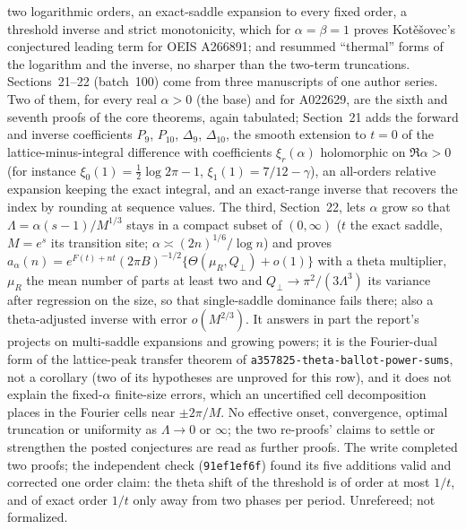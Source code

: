 \documentclass[11pt]{article}
\newcommand{\dir}[1]{\texttt{#1}}
\begin{document}
{two logarithmic orders, an exact-saddle expansion to every fixed order, a
threshold inverse and strict monotonicity, which for $\alpha=\beta=1$ proves
Kot\v{e}\v{s}ovec's conjectured leading term for OEIS A266891; and resummed
``thermal'' forms of the logarithm and the inverse, no sharper than the
two-term truncations.
Sections~21--22 (batch~100) come from three manuscripts of one author series.
Two of them, for every real $\alpha>0$ (the base) and for A022629, are the
sixth and seventh proofs of the core theorems, again tabulated; Section~21
adds the forward and inverse coefficients $P_9$, $P_{10}$, $\Delta_9$,
$\Delta_{10}$, the smooth extension to $t=0$ of the lattice-minus-integral
difference with coefficients $\xi_r(\alpha)$ holomorphic on $\Re\alpha>0$
(for instance $\xi_0(1)=\frac12\log2\pi-1$, $\xi_1(1)=7/12-\gamma$), an
all-orders relative expansion keeping the exact integral, and an exact-range
inverse that recovers the index by rounding at sequence values.  The third,
Section~22, lets $\alpha$ grow so that $\Lambda=\alpha(s-1)/M^{1/3}$ stays in
a compact subset of $(0,\infty)$ ($t$ the exact saddle, $M=e^s$ its
transition site; $\alpha\asymp(2n)^{1/6}/\log n$) and proves
$a_\alpha(n)=e^{F(t)+nt}(2\pi B)^{-1/2}\{\Theta(\mu_R,Q_\perp)+o(1)\}$ with
a theta multiplier, $\mu_R$ the mean number of parts at least two and
$Q_\perp\to\pi^2/(3\Lambda^3)$ its variance after regression on the size, so
that single-saddle dominance fails there; also a theta-adjusted inverse with
error $o(M^{2/3})$.  It answers in part the report's projects on multi-saddle
expansions and growing powers; it is the Fourier-dual form of the lattice-peak
transfer theorem of \dir{a357825-theta-ballot-power-sums}, not a corollary
(two of its hypotheses are unproved for this row), and it does not explain
the fixed-$\alpha$ finite-size errors, which an uncertified cell
decomposition places in the Fourier cells near $\pm2\pi/M$.  No effective
onset, convergence, optimal truncation or uniformity as $\Lambda\to0$ or
$\infty$; the two re-proofs' claims to settle or strengthen the posted
conjectures are read as further proofs.  The write completed two proofs; the independent check
(\texttt{91ef1ef6f}) found its five additions valid and corrected one order
claim: the theta shift of the threshold is of order at most $1/t$, and of
exact order $1/t$ only away from two phases per period.  Unrefereed; not
formalized.}
\end{document}
